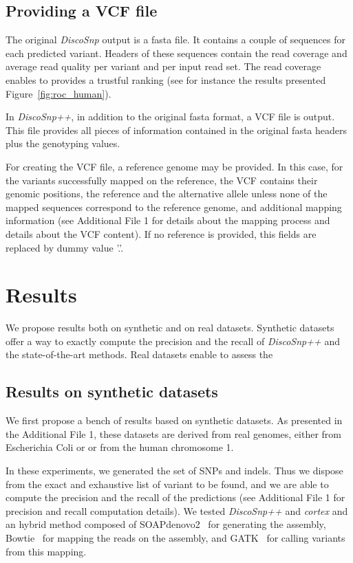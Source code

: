 \documentclass{bmcart}
\newcommand{\disco}{{\it DiscoSnp}\xspace}
\newcommand{\discopp}{{\it DiscoSnp++}\xspace}
\newcommand{\co}{{\it cortex}\xspace}
\begin{document}
\subsection*{Providing a VCF file}
The original \disco output is a fasta file. It contains a couple of sequences for each predicted variant. Headers of these sequences contain the read coverage and average read quality per variant and per input read set. The read coverage enables to provides a trustful ranking (see for instance the results presented Figure~\ref{fig:roc_human}).

In \discopp, in addition to the original fasta format, a VCF file is output. This file provides all pieces of information contained in the original fasta headers plus the genotyping values.


For creating the VCF file, a reference genome may be provided. In this case, for the variants successfully mapped on the reference, the VCF contains their genomic positions, the reference and the alternative allele unless none of the mapped sequences correspond to the reference genome, and additional mapping information (see Additional File 1 for details about the mapping process and details about the VCF content). 
If no reference is provided, this fields are replaced by dummy value '.'.




\section*{Results}
We propose results both on synthetic and on real datasets. Synthetic datasets offer a way to exactly compute the precision and the recall of \discopp and the state-of-the-art methods. Real datasets enable to assess the 

\subsection*{Results on synthetic datasets}
We first propose a bench of results based on synthetic datasets. As presented in the Additional File 1, these datasets are derived from real genomes, either from Escherichia Coli or or from the human chromosome 1. 

In these experiments, we generated the set of SNPs and indels. Thus we dispose from the exact and exhaustive list of variant to be found, and we are able to compute the precision and the recall of the predictions (see Additional File 1 for precision and recall computation details). We tested \discopp and \co and an hybrid method composed of SOAPdenovo2~\cite{luo2012soapdenovo2} for generating the assembly, Bowtie~\cite{langmead2012fast} for mapping the reads on the assembly, and GATK~\cite{gatk} for calling variants from this mapping. 
\end{document}
